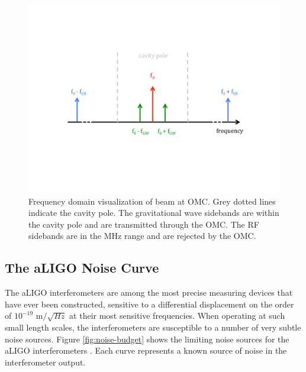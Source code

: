 \begin{figure}[ht!]
\includegraphics[width=\textwidth]{figures/introduction/omc-freq}
\caption[Sidebands and OMC cavity pole]{Frequency domain visualization of beam %
         at OMC. Grey dotted lines indicate the cavity pole. The gravitational %
         wave sidebands are within the cavity pole and are transmitted through %
         the OMC. The RF sidebands are in the MHz range and are rejected by the %
         OMC.}
\label{fig:omc-freq}
\end{figure}


\subsection{The aLIGO Noise Curve}

The aLIGO interferometers are among the most precise measuring devices 
that have ever been constructed, sensitive to a differential displacement 
on the order of $10^{-19}$ m$/\sqrt{Hz}$ at their most sensitive frequencies. 
When operating at such small length scales, 
the interferometers are susceptible to a number of very subtle noise sources. 
Figure \ref{fig:noise-budget} shows the limiting noise sources for the 
aLIGO interferometers \cite{GW150914-DETECTORS}. Each curve represents 
a known source of noise in the interferometer output. 


